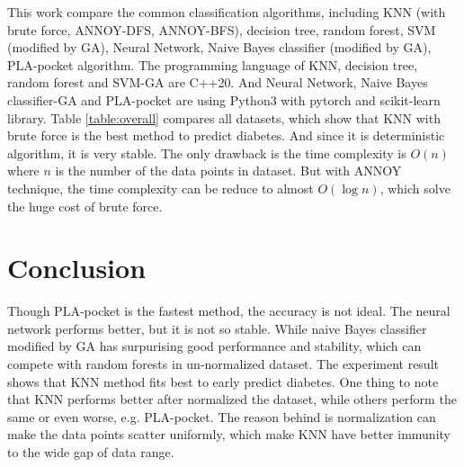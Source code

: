 \documentclass[twocolumn,10pt]{article}
\begin{document}
  This work compare the common classification algorithms, including KNN (with brute force, ANNOY-DFS, ANNOY-BFS), decision tree, 
  random forest, SVM (modified by GA), Neural Network, Naive Bayes classifier (modified by GA), PLA-pocket algorithm. 
  The programming language of KNN, decision tree, random forest and SVM-GA are C++20. And Neural Network, Naive Bayes classifier-GA 
  and PLA-pocket are using Python3 with pytorch and scikit-learn library. 
  Table \ref{table:overall} compares all datasets, which show that KNN with brute force is the best method to predict 
  diabetes. And since it is deterministic algorithm, it is very stable. The only drawback is the time complexity is $O(n)$ where 
  $n$ is the number of the data points in dataset. But with ANNOY technique, the time complexity can be reduce to almost $O(\log n)$, 
  which solve the huge cost of brute force.

\section{Conclusion}
  Though PLA-pocket is the fastest method, the accuracy is not ideal. The neural network performs better, but it is not so stable. 
  While naive Bayes classifier modified by GA has surpurising good performance and stability, which can compete with random forests 
  in un-normalized dataset. The experiment result shows that KNN method fits best to early predict diabetes. 
  One thing to note that KNN performs better after normalized the dataset, while others perform the same or even worse, e.g. PLA-pocket. 
  The reason behind is normalization can make the data points scatter uniformly, which make KNN have better immunity to the wide gap 
  of data range.


\end{document}
